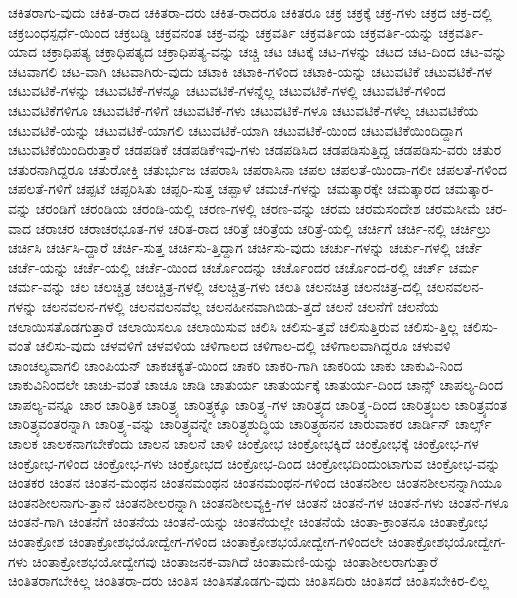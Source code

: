 {ಚಕಿತರಾಗು-ವುದು
ಚಕಿತ-ರಾದ
ಚಕಿತರಾ-ದರು
ಚಕಿತ-ರಾದರೂ
ಚಕಿತರೂ
ಚಕ್ರ
ಚಕ್ರಕ್ಕೆ
ಚಕ್ರ-ಗಳು
ಚಕ್ರದ
ಚಕ್ರ-ದಲ್ಲಿ
ಚಕ್ರಬಂಧಸ್ಪರ್ಧೆ-ಯಿಂದ
ಚಕ್ರಬಡ್ಡಿ
ಚಕ್ರವನಂತ
ಚಕ್ರ-ವನ್ನು
ಚಕ್ರವರ್ತಿ
ಚಕ್ರವರ್ತಿಯ
ಚಕ್ರವರ್ತಿ-ಯನ್ನು
ಚಕ್ರವರ್ತಿ-ಯಾದ
ಚಕ್ರಾಧಿಪತ್ಯ
ಚಕ್ರಾಧಿಪತ್ಯದ
ಚಕ್ರಾಧಿಪತ್ಯ-ವನ್ನು
ಚಚ್ಚಿ
ಚಟ
ಚಟಕ್ಕೆ
ಚಟ-ಗಳನ್ನು
ಚಟದ
ಚಟ-ದಿಂದ
ಚಟ-ವನ್ನು
ಚಟವಾಗಲಿ
ಚಟ-ವಾಗಿ
ಚಟವಾಗಿರು-ವುದು
ಚಟಾಕಿ
ಚಟಾಕಿ-ಗಳಿಂದ
ಚಟಾಕಿ-ಯನ್ನು
ಚಟುವಟಿಕೆ
ಚಟುವಟಿಕೆ-ಗಳ
ಚಟುವಟಿಕೆ-ಗಳನ್ನು
ಚಟುವಟಿಕೆ-ಗಳನ್ನೂ
ಚಟುವಟಿಕೆ-ಗಳನ್ನೆಲ್ಲ
ಚಟುವಟಿಕೆ-ಗಳಲ್ಲಿ
ಚಟುವಟಿಕೆ-ಗಳಿಂದ
ಚಟುವಟಿಕೆಗಳಿಗೂ
ಚಟುವಟಿಕೆ-ಗಳಿಗೆ
ಚಟುವಟಿಕೆ-ಗಳು
ಚಟುವಟಿಕೆ-ಗಳೂ
ಚಟುವಟಿಕೆ-ಗಳೆಲ್ಲ
ಚಟುವಟಿಕೆಯ
ಚಟುವಟಿಕೆ-ಯನ್ನು
ಚಟುವಟಿಕೆ-ಯಾಗಲಿ
ಚಟುವಟಿಕೆ-ಯಾಗಿ
ಚಟುವಟಿಕೆ-ಯಿಂದ
ಚಟುವಟಿಕೆಯಿಂದಿದ್ದಾಗ
ಚಟುವಟಿಕೆಯಿಂದಿರುತ್ತಾರೆ
ಚಡಪಡಿಕೆ
ಚಡಪಡಿಕೆಇವು-ಗಳು
ಚಡಪಡಿಸಿದ
ಚಡಪಡಿಸುತ್ತಿದ್ದ
ಚಡಪಡಿಸು-ವರು
ಚತುರ
ಚತುರನಾಗಿದ್ದರೂ
ಚತುರೋಕ್ತಿ
ಚತುರ್ಭುಜ
ಚಪರಾಸಿ
ಚಪರಾಸಿನಾ
ಚಪಲ
ಚಪಲತೆ-ಯಿಂದಾ-ಗಲೀ
ಚಪಲತೆ-ಗಳಿಂದ
ಚಪಲತೆ-ಗಳಿಗೆ
ಚಪ್ಪಟೆ
ಚಪ್ಪರಿಸಿತು
ಚಪ್ಪರಿ-ಸುತ್ತ
ಚಪ್ಪಾಳೆ
ಚಮಚೆ-ಗಳನ್ನು
ಚಮತ್ಕಾರಕ್ಕೇ
ಚಮತ್ಕಾರದ
ಚಮತ್ಕಾರ-ವನ್ನು
ಚರಂಡಿಗೆ
ಚರಂಡಿಯ
ಚರಂಡಿ-ಯಲ್ಲಿ
ಚರಣ-ಗಳಲ್ಲಿ
ಚರಣ-ವನ್ನು
ಚರಮ
ಚರಮಸಂದೇಶ
ಚರಮಸೀಮೆ
ಚರ-ವಾದ
ಚರಾಚರ
ಚರಾಚರಭೂತ-ಗಳ
ಚರಿತ-ರಾದ
ಚರಿತ್ರೆ
ಚರಿತ್ರೆಯ
ಚರಿತ್ರೆ-ಯಲ್ಲಿ
ಚರ್ಚಿಗೆ
ಚರ್ಚಿ-ನಲ್ಲಿ
ಚರ್ಚಿಲ್ರು
ಚರ್ಚಿಸಿ
ಚರ್ಚಿಸಿ-ದ್ದಾರೆ
ಚರ್ಚಿ-ಸುತ್ತ
ಚರ್ಚಿಸು-ತ್ತಿದ್ದಾಗ
ಚರ್ಚಿಸು-ವುದು
ಚರ್ಚು-ಗಳನ್ನು
ಚರ್ಚು-ಗಳಲ್ಲಿ
ಚರ್ಚೆ
ಚರ್ಚೆ-ಯನ್ನು
ಚರ್ಚೆ-ಯಲ್ಲಿ
ಚರ್ಚೆ-ಯಿಂದ
ಚರ್ಚೊಂದನ್ನು
ಚರ್ಚೊಂದರ
ಚರ್ಚೊಂದ-ರಲ್ಲಿ
ಚರ್ಚ್
ಚರ್ಮ
ಚರ್ಮ-ವನ್ನು
ಚಲ
ಚಲಚ್ಚಿತ್ರ
ಚಲಚ್ಚಿತ್ರ-ಗಳಲ್ಲಿ
ಚಲಚ್ಚಿತ್ರ-ಗಳು
ಚಲತಿ
ಚಲನಚಿತ್ರ
ಚಲನಚಿತ್ರ-ದಲ್ಲಿ
ಚಲನವಲನ-ಗಳನ್ನು
ಚಲನವಲನ-ಗಳಲ್ಲಿ
ಚಲನವಲನವೆಲ್ಲ
ಚಲನಹೀನವಾಗಿಬಿಡು-ತ್ತದೆ
ಚಲನೆ
ಚಲನೆಗೆ
ಚಲನೆಯ
ಚಲಾಯಿಸತೊಡಗುತ್ತಾರೆ
ಚಲಾಯಿಸಲೂ
ಚಲಾಯಿಸುವ
ಚಲಿಸಿ
ಚಲಿಸು-ತ್ತವೆ
ಚಲಿಸುತ್ತಿರುವ
ಚಲಿಸು-ತ್ತಿಲ್ಲ
ಚಲಿಸು-ವಂತೆ
ಚಲಿಸು-ವುದು
ಚಳವಳಿಗೆ
ಚಳವಳಿಯ
ಚಳಿಗಾಲದ
ಚಳಿಗಾಲ-ದಲ್ಲಿ
ಚಳಿಗಾಲವಾಗಿದ್ದರೂ
ಚಳುವಳಿ
ಚಾಂಚಲ್ಯವಾಗಲಿ
ಚಾಂಪಿಯನ್
ಚಾಕಚಕ್ಯತೆ-ಯಿಂದ
ಚಾಕರಿ
ಚಾಕರಿ-ಗಾಗಿ
ಚಾಕರಿಯ
ಚಾಕು
ಚಾಕುವಿ-ನಿಂದ
ಚಾಕುವಿನಿಂದಲೇ
ಚಾಚು-ವಂತೆ
ಚಾಚೂ
ಚಾಡಿ
ಚಾತುರ್ಯ
ಚಾತುರ್ಯಕ್ಕೆ
ಚಾತುರ್ಯ-ದಿಂದ
ಚಾನ್ಸ್
ಚಾಪಲ್ಯ-ದಿಂದ
ಚಾಪಲ್ಯ-ವನ್ನೂ
ಚಾರ
ಚಾರಿತ್ರಿಕ
ಚಾರಿತ್ರ್ಯ
ಚಾರಿತ್ರ್ಯಕ್ಕೂ
ಚಾರಿತ್ರ್ಯ-ಗಳ
ಚಾರಿತ್ರ್ಯದ
ಚಾರಿತ್ರ್ಯ-ದಿಂದ
ಚಾರಿತ್ರ್ಯಬಲ
ಚಾರಿತ್ರ್ಯವಂತ
ಚಾರಿತ್ರ್ಯವಂತರನ್ನಾಗಿ
ಚಾರಿತ್ರ್ಯ-ವನ್ನು
ಚಾರಿತ್ರ್ಯವನ್ನೇ
ಚಾರಿತ್ರ್ಯಶುದ್ಧಿಯ
ಚಾರಿತ್ರ್ಯಹನನ
ಚಾರುವಾಕರ
ಚಾರ್ಡಿನ್
ಚಾರ್ಲ್ಸ್
ಚಾಲಕ
ಚಾಲಕನಾಗಬೇಕೆಂದು
ಚಾಲನ
ಚಾಲನೆ
ಚಾಳಿ
ಚಿಂಕ್ರೋಭ
ಚಿಂಕ್ರೋಭಕ್ಕಿದೆ
ಚಿಂಕ್ರೋಭಕ್ಕೆ
ಚಿಂಕ್ರೋಭ-ಗಳ
ಚಿಂಕ್ರೋಭ-ಗಳಿಂದ
ಚಿಂಕ್ರೋಭ-ಗಳು
ಚಿಂಕ್ರೋಭದ
ಚಿಂಕ್ರೋಭ-ದಿಂದ
ಚಿಂಕ್ರೋಭದಿಂದುಂಟಾಗುವ
ಚಿಂಕ್ರೋಭ-ವನ್ನು
ಚಿಂತಕರ
ಚಿಂತನ
ಚಿಂತನ-ಮಂಥನ
ಚಿಂತನಮಂಥನ
ಚಿಂತನಮಂಥನ-ಗಳಿಂದ
ಚಿಂತನಶೀಲ
ಚಿಂತನಶೀಲನನ್ನಾಗಿಯೂ
ಚಿಂತನಶೀಲನಾಗು-ತ್ತಾನೆ
ಚಿಂತನಶೀಲರನ್ನಾಗಿ
ಚಿಂತನಶೀಲವ್ಯಕ್ತಿ-ಗಳ
ಚಿಂತನೆ
ಚಿಂತನೆ-ಗಳ
ಚಿಂತನೆ-ಗಳು
ಚಿಂತನೆ-ಗಳೂ
ಚಿಂತನೆ-ಗಾಗಿ
ಚಿಂತನೆಗೆ
ಚಿಂತನೆಯ
ಚಿಂತನೆ-ಯನ್ನು
ಚಿಂತನೆಯಲ್ಲೇ
ಚಿಂತನೆಯೆ
ಚಿಂತಾ-ಕ್ರಾಂತನೂ
ಚಿಂತಾಕ್ರೋಭ
ಚಿಂತಾಕ್ರೋಶ
ಚಿಂತಾಕ್ರೋಶಭಯೋದ್ವೇಗ-ಗಳಿಂದ
ಚಿಂತಾಕ್ರೋಶಭಯೋದ್ವೇಗ-ಗಳಿಂದಲೇ
ಚಿಂತಾಕ್ರೋಶಭಯೋದ್ವೇಗ-ಗಳು
ಚಿಂತಾಕ್ರೋಶಭಯೋದ್ವೇಗವು
ಚಿಂತಾಜನಕ-ವಾಗಿದೆ
ಚಿಂತಾಮಣಿ-ಯನ್ನು
ಚಿಂತಾಶೀಲರಾಗುತ್ತಾರೆ
ಚಿಂತಿತರಾಗಬೇಕಿಲ್ಲ
ಚಿಂತಿತರಾ-ದರು
ಚಿಂತಿಸ
ಚಿಂತಿಸತೊಡಗು-ವುದು
ಚಿಂತಿಸದಿರು
ಚಿಂತಿಸದೆ
ಚಿಂತಿಸಬೇಕಿರ-ಲಿಲ್ಲ
}
